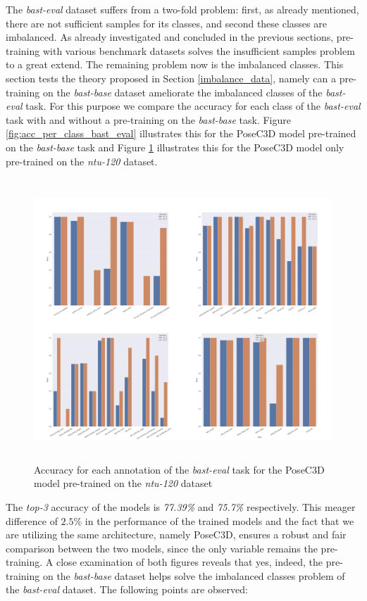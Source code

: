 \documentclass[extern,palatino]{cgMA}
\begin{document}
The \textit{bast-eval} dataset suffers from a two-fold problem: first, as already mentioned, there are not sufficient samples for its classes, and second these classes are imbalanced. As already investigated and concluded in the previous sections, pre-training with various benchmark datasets solves the insufficient samples problem to a great extend. The remaining problem now is the imbalanced classes. This section tests the theory proposed in Section \ref{imbalance_data}, namely can a pre-training on the \textit{bast-base} dataset ameliorate the imbalanced classes of the \textit{bast-eval} task. For this purpose we compare the accuracy for each class of the \textit{bast-eval} task with and without a pre-training on the \textit{bast-base} task. Figure \ref{fig:acc_per_class_bast_eval} illustrates this for the PoseC3D model pre-trained on the \textit{bast-base} task and Figure \ref{fig:acc_per_class_bast_eval_ntu} illustrates this for the PoseC3D model only pre-trained on the \textit{ntu-120} dataset. 

\begin{figure}[h]
\center
\includegraphics[height={300pt}, width={430pt}]{Thesis/images/posec3d_eval_ntu-120.jpg}
\caption{Accuracy for each annotation of the \textit{bast-eval} task for the PoseC3D model pre-trained on the \textit{ntu-120} dataset}
\label{fig:acc_per_class_bast_eval_ntu}
\end{figure}

\bigskip
\noindent The \textit{top-3} accuracy of the models is \textit{77.39\%} and \textit{75.7\%} respectively. This meager difference of $2.5\%$ in the performance of the trained models and the fact that we are utilizing the same architecture, namely PoseC3D, ensures a robust and fair comparison between the two models, since the only variable remains the pre-training. A close examination of both figures reveals that yes, indeed, the pre-training on the \textit{bast-base} dataset helps solve the imbalanced classes problem of the \textit{bast-eval} dataset. The following points are observed:
\end{document}
